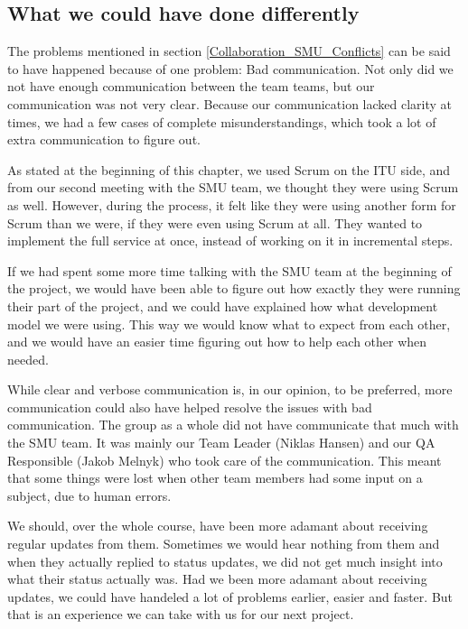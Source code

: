 \subsection{What we could have done differently}
\label{Collaboration_SMU_CouldHave}
The problems mentioned in section \ref{Collaboration_SMU_Conflicts} can be said to have happened because of one problem: Bad communication. Not only did we not have enough communication between the team teams, but our communication was not very clear. Because our communication lacked clarity at times, we had a few cases of complete misunderstandings, which took a lot of extra communication to figure out.

As stated at the beginning of this chapter, we used Scrum on the ITU side, and from our second meeting with the SMU team, we thought they were using Scrum as well. However, during the process, it felt like they were using another form for Scrum than we were, if they were even using Scrum at all. They wanted to implement the full service at once, instead of working on it in incremental steps.

If we had spent some more time talking with the SMU team at the beginning of the project, we would have been able to figure out how exactly they were running their part of the project, and we could have explained how what development model we were using. This way we would know what to expect from each other, and we would have an easier time figuring out how to help each other when needed.

While clear and verbose communication is, in our opinion, to be preferred, more communication could also have helped resolve the issues with bad communication. The group as a whole did not have communicate that much with the SMU team. It was mainly our Team Leader (Niklas Hansen) and our QA Responsible (Jakob Melnyk) who took care of the communication. This meant that some things were lost when other team members had some input on a subject, due to human errors.

We should, over the whole course, have been more adamant about receiving regular updates from them. Sometimes we would hear nothing from them and when they actually replied to status updates, we did not get much insight into what their status actually was. Had we been more adamant about receiving updates, we could have handeled a lot of problems earlier, easier and faster. But that is an experience we can take with us for our next project.